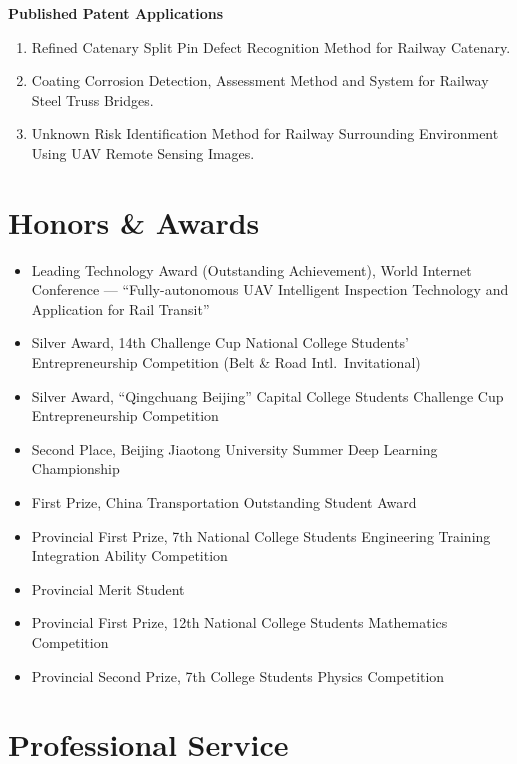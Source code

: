 \documentclass[11pt,a4paper]{article}
\begin{document}
\noindent\textbf{Published Patent Applications}

\begin{enumerate}[leftmargin=*,nosep,itemsep=2pt]
  \item Refined Catenary Split Pin Defect Recognition Method for Railway Catenary.
  \item Coating Corrosion Detection, Assessment Method and System for Railway Steel Truss Bridges.
  \item Unknown Risk Identification Method for Railway Surrounding Environment Using UAV Remote Sensing Images.
\end{enumerate}

\section{Honors \& Awards}

\begin{itemize}[leftmargin=*,nosep,itemsep=2pt]
  \item[2024] Leading Technology Award (Outstanding Achievement), World Internet Conference --- ``Fully-autonomous UAV Intelligent Inspection Technology and Application for Rail Transit''
  \item[2024] Silver Award, 14th Challenge Cup National College Students' Entrepreneurship Competition (Belt \& Road Intl.\ Invitational)
  \item[2024] Silver Award, ``Qingchuang Beijing'' Capital College Students Challenge Cup Entrepreneurship Competition
  \item[2022] Second Place, Beijing Jiaotong University Summer Deep Learning Championship
  \item[2021] First Prize, China Transportation Outstanding Student Award
  \item[2021] Provincial First Prize, 7th National College Students Engineering Training Integration Ability Competition
  \item[2021] Provincial Merit Student
  \item[2020] Provincial First Prize, 12th National College Students Mathematics Competition
  \item[2020] Provincial Second Prize, 7th College Students Physics Competition
\end{itemize}

\section{Professional Service}
\end{document}
